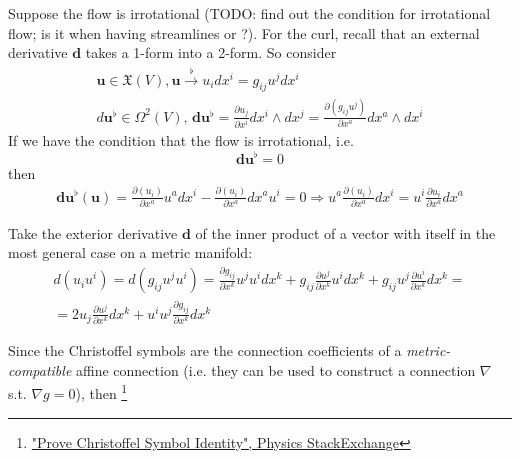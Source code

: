 \documentclass[10pt]{amsart}
\begin{document}
\begin{multicols*}{2}
Suppose the flow is irrotational (TODO: find out the condition for irrotational flow; is it when having streamlines or ?). For the curl, recall that an external derivative $\mathbf{d}$ takes a 1-form into a 2-form. So consider
\[
\begin{gathered}
 \mathbf{u} \in \mathfrak{X}(V), \mathbf{u} \xrightarrow{\flat} u_i dx^i = g_{ij} u^j dx^i \\ 
 d\mathbf{u}^{\flat} \in \Omega^2(V), \, \mathbf{d}\mathbf{u}^{\flat} = \frac{\partial u_j}{\partial x^i} dx^i \wedge dx^j = \frac{ \partial (g_{ij} u^j) }{\partial x^a} dx^a \wedge dx^i
\end{gathered}
\]
If we have the condition that the flow is irrotational, i.e. 
\begin{equation}
\mathbf{d}\mathbf{u}^{\flat} = 0
\end{equation}
then
\[
\begin{gathered}
	\mathbf{d}\mathbf{u}^{\flat} (\mathbf{u}) = \frac{\partial (u_i) }{ \partial x^a} u^a dx^i - \frac{\partial (u_i) }{ \partial x^a} dx^a u^i = 0 \Longrightarrow u^a \frac{ \partial (u_i) }{ \partial x^a} dx^i = u^i \frac{\partial u_i}{ \partial x^a} dx^a
\end{gathered}
\]


Take the exterior derivative $\mathbf{d}$ of the inner product of a vector with itself in the most general case on a metric manifold:
\[
\begin{gathered}
d(u_i u^i) = d(g_{ij} u^j u^i) = \frac{ \partial g_{ij} }{ \partial x^k} u^j u^i dx^k  + g_{ij} \frac{ \partial u^j}{ \partial x^k} u^i dx^k + g_{ij} u^j \frac{\partial u^i}{\partial x^k} dx^k = \\
= 2 u_j \frac{ \partial u^j}{\partial x^k} dx^k + u^i u^j \frac{\partial g_{ij}}{\partial x^k} dx^k 
\end{gathered}
\]


Since the Christoffel symbols are the connection coefficients of a \emph{metric-compatible} affine connection (i.e. they can be used to construct a connection $\nabla$ s.t. $\nabla g = 0$), then \footnote{ \href{https://physics.stackexchange.com/questions/175235/prove-christoffel-symbol-identity}{"Prove Christoffel Symbol Identity", Physics StackExchange}}


\end{multicols*}
\end{document}
